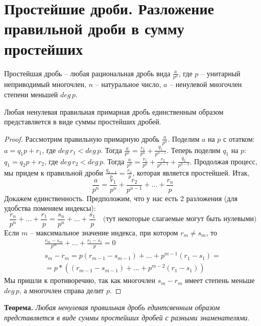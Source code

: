 \section{Простейшие дроби. Разложение правильной дроби в сумму простейших}
\begin{conj}
    Простейшая дробь -- любая рациональная дробь вида $\frac{a}{p^n}$, где $p$ -- унитарный неприводимый многочлен, 
    $n$ -- натуральное число, $a$ -- ненулевой многочлен степени меньшей $deg \, p$. 
\end{conj}

\begin{theorem-non}
    Любая ненулевая правильная примарная дробь единственным образом представляется в виде суммы простейших дробей.
\end{theorem-non}

\begin{proof}
    Рассмотрим правильную примарную дробь $\frac{a}{p^n}$. 
    Поделим $a$ на $p$ с отатком: $a = q_1p + r_1$, где $deg \, r_1 < deg \, p$. 
    Тогда $\frac{a}{p^n} = \frac{r_1}{p^n} + \frac{q_1}{p^{n - 1}}$. 
    Теперь поделим $q_1$ на $p$: $q_1 = q_2p + r_2$, где $deg \, r_2 < deg \, p$.
    Тогда $\frac{a}{p^n} = \frac{r_1}{p^n} + \frac{r_2}{p^{n - 1}} + \frac{q_2}{p^{n - 2}}$.
    Продолжая процесс, мы придем к правильной дроби $\frac{q_{n - 1}}{p} = \frac{r_n}{p}$, которая является простейшей. 
    Итак, \[ \frac{a}{p^n} = \frac{r_1}{p^n} + \frac{r_2}{p^{n - 1}} + \dots + \frac{r_n}{p} \]
    Докажем единственность. 
    Предположим, что у нас есть 2 разложения (для удобства поменяем индексы):
    \[ \frac{r_n}{p^n} + \dots + \frac{r_1}{p} = \frac{s_n}{p^n} + \dots + \frac{s_1}{p} \quad \text{(тут некоторые слагаемые могут быть нулевыми)} \]
    Если $m$ -- максимальное значение индекса, при котором $r_m \neq s_m$, то 
    \begin{gather*}
        \frac{r_m - s_m}{p^m} + \dots + \frac{r_1 - s_1}{p} = 0 \\
        s_m - r_m = p(r_{m - 1} - s_{m - 1}) + \dots + p^{m - 1}(r_1 - s_1) = \\
        = p * ((r_{m - 1} - s_{m - 1}) + \dots + p^{m - 2}(r_1 - s_1))
    \end{gather*}
    Мы пришли к противоречию, так как многочлен $s_m - r_m$ имеет степень меньше $deg \, p$, а многочлен справа делит $p$.
\end{proof}

\vspace{7mm}

\textbf{Теорема.}
\textit{Любая ненулевая правильная дробь единтсвенным образом представляется в виде суммы простейших дробей с разными знаменателями.}

